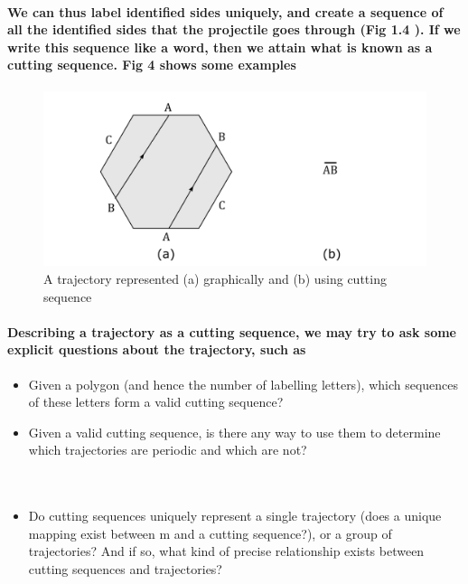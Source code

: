\documentclass{report}
\begin{document}
\paragraph{We can thus label identified sides uniquely, and create a sequence of all the identified sides that the projectile goes through (Fig 1.4 ). If we write this sequence like a word, then we attain what is known as a cutting sequence. Fig 4 shows some examples}

\begin{center}
\begin{figure} 
\includegraphics[scale=0.3]{4}
\caption{A trajectory represented (a) graphically and (b) using cutting sequence}
\end{figure}
\end{center}

\paragraph{Describing a trajectory as a cutting sequence, we may try to ask some explicit questions about the trajectory, such as}

\begin{itemize}

\item Given a polygon (and hence the number of labelling letters), which sequences of these letters form a valid cutting sequence?

\item Given a valid cutting sequence, is there any way to use them to determine which trajectories are periodic and which are not?\\ \\ \\

\item Do cutting sequences uniquely represent a single trajectory (does a unique mapping exist between m and a cutting sequence?), or a group of trajectories? And if so, what kind of precise relationship exists between cutting sequences and trajectories?

\end{itemize}
\end{document}
